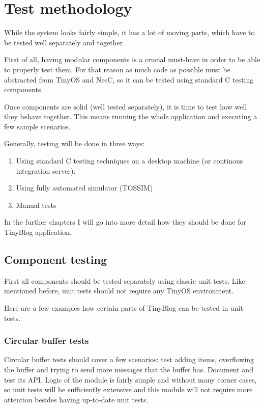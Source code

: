 \documentclass[english,11pt]{article}
\numberwithin{equation}{section}
\begin{document}
\section{Test methodology}

While the system looks fairly simple, it has a lot of moving parts, which have
to be tested well separately and together.

First of all, having modular components is a crucial must-have in order to be
able to properly test them. For that reason as much code as possible must be
abstracted from TinyOS and NesC, so it can be tested using standard C testing
components.

Once components are solid (well tested separately), it is time to test how well
they behave together. This means running the whole application and executing a
few sample scenarios.

Generally, testing will be done in three ways:
\begin{enumerate}
    \item Using standard C testing techniques on a desktop machine (or continous
        integration server).
    \item Using fully automated simulator (TOSSIM)
    \item Manual tests
\end{enumerate}

In the further chapters I will go into more detail how they should be done for
TinyBlog application.

\subsection{Component testing}

First all components should be tested separately using classic unit tests. Like
mentioned before, unit tests should not require any TinyOS environment.

Here are a few examples how certain parts of TinyBlog can be tested in unit
tests.

\subsubsection{Circular buffer tests}

Circular buffer tests should cover a few scenarios: test adding items,
overflowing the buffer and trying to send more messages that the buffer has.
Document and test its API. Logic of the module is fairly simple and without many
corner cases, so unit tests will be sufficiently extensive and this module will
not require more attention besides having up-to-date unit tests.
\end{document}
